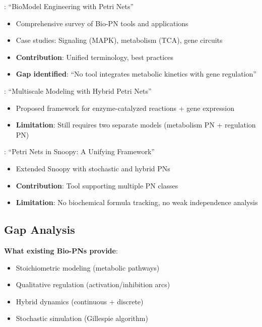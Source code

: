 \textbf{\citet{Blaetke2015}}: ``BioModel Engineering with Petri Nets''

\begin{itemize}
    \item Comprehensive survey of Bio-PN tools and applications
    \item Case studies: Signaling (MAPK), metabolism (TCA), gene circuits
    \item \textbf{Contribution}: Unified terminology, best practices
    \item \textbf{Gap identified}: ``No tool integrates metabolic kinetics with gene regulation''
\end{itemize}

\textbf{\citet{Liu2013}}: ``Multiscale Modeling with Hybrid Petri Nets''

\begin{itemize}
    \item Proposed framework for enzyme-catalyzed reactions + gene expression
    \item \textbf{Limitation}: Still requires two separate models (metabolism PN + regulation PN)
\end{itemize}

\textbf{\citet{Marwan2011}}: ``Petri Nets in Snoopy: A Unifying Framework''

\begin{itemize}
    \item Extended Snoopy with stochastic and hybrid PNs
    \item \textbf{Contribution}: Tool supporting multiple PN classes
    \item \textbf{Limitation}: No biochemical formula tracking, no weak independence analysis
\end{itemize}

\subsection{Gap Analysis}
\label{subsec:bio-pn-gap}

\textbf{What existing Bio-PNs provide}:

\begin{itemize}
    \item[$\checkmark$] Stoichiometric modeling (metabolic pathways)
    \item[$\checkmark$] Qualitative regulation (activation/inhibition arcs)
    \item[$\checkmark$] Hybrid dynamics (continuous + discrete)
    \item[$\checkmark$] Stochastic simulation (Gillespie algorithm)
\end{itemize}

